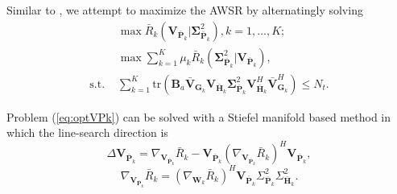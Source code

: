 \documentclass{article}
\begin{document}
    Similar to \cite{xiao2011globally}, we attempt to maximize the AWSR by alternatingly solving
    \begin{align}
        \label{eq:optVPk}
     &   \max \bar{R}_k(\mathbf{V}_{\bar{\mathbf{P}}_k}|\mathbf{\Sigma}_{\bar{\mathbf{P}}_k}^2), k=1,\ldots,K;
\\
      & \max \sum\nolimits_{k=1}^K\mu_k\bar{R}_k(\mathbf{\Sigma}_{\bar{\mathbf{P}}_k}^2|\mathbf{V}_{\bar{\mathbf{P}}_k}),                     \label{eq:optSigmaP}\\
            \mbox{s.t. } &  %
            \sum\nolimits_{k=1}^K\mbox{tr}(\mathbf{B}_a\bar{\mathbf{V}}_{\mathbf{G}_k}\mathbf{V}_{\bar{\mathbf{H}}_k}\mathbf{\Sigma}_{\bar{\mathbf{P}}_k}^2\mathbf{V}_{\bar{\mathbf{H}}_k}^H\bar{\mathbf{V}}_{\mathbf{G}_k}^H)\leq N_t.\nonumber
\end{align}

    Problem (\ref{eq:optVPk}) can be solved with a Stiefel manifold based method \cite{zeng2012linearrelay} in which the line-search direction is
    \begin{equation}
        \label{eq:deltaVBDAGDP}
        \Delta\mathbf{V}_{\bar{\mathbf{P}}_k} = \nabla_{\mathbf{V}_{\bar{\mathbf{P}}_k}}\bar{R}_k - \mathbf{V}_{\bar{\mathbf{P}}_k}(\nabla_{\mathbf{V}_{\bar{\mathbf{P}}_k}}\bar{R}_k)^H\mathbf{V}_{\bar{\mathbf{P}}_k},
    \end{equation}
    \begin{equation}
        \label{eq:gradVBDAGDP}
        \nabla_{\mathbf{V}_{\bar{\mathbf{P}}_k}}\bar{R}_k = (\nabla_{\mathbf{W}_k} \bar{R}_k)^H \mathbf{V}_{\bar{\mathbf{P}}_k}\Sigma_{\bar{\mathbf{P}}_k}^2\Sigma_{\bar{\mathbf{H}}_k}^2.
    \end{equation}
\end{document}
